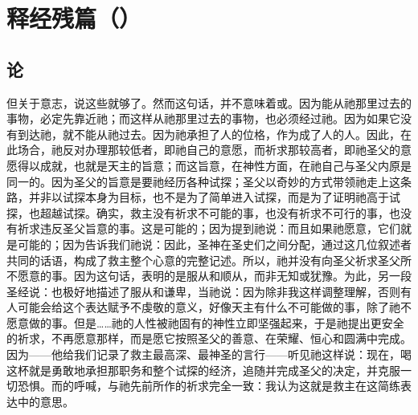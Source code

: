
\chapter{释经残篇（）}



\section{论}

\par

但关于意志，说这些就够了。然而这句话，并不意味着或。因为能从祂那里过去的事物，必定先靠近祂；而这样从祂那里过去的事物，也必须经过祂。因为如果它没有到达祂，就不能从祂过去。因为祂承担了人的位格，作为成了人的人。因此，在此场合，祂反对办理那较低者，即祂自己的意愿，而祈求那较高者，即祂圣父的意愿得以成就，也就是天主的旨意；而这旨意，在神性方面，在祂自己与圣父内原是同一的。因为圣父的旨意是要祂经历各种试探；圣父以奇妙的方式带领祂走上这条路，并非以试探本身为目标，也不是为了简单进入试探，而是为了证明祂高于试探，也超越试探。确实，救主没有祈求不可能的事，也没有祈求不可行的事，也没有祈求违反圣父旨意的事。这是可能的；因为提到祂说：而且如果祂愿意，它们就是可能的；因为告诉我们祂说：因此，圣神在圣史们之间分配，通过这几位叙述者共同的话语，构成了救主整个心意的完整记述。所以，祂并没有向圣父祈求圣父所不愿意的事。因为这句话，表明的是服从和顺从，而非无知或犹豫。为此，另一段圣经说：也极好地描述了服从和谦卑，当祂说：因为除非我这样调整理解，否则有人可能会给这个表达赋予不虔敬的意义，好像天主有什么不可能做的事，除了祂不愿意做的事。但是……祂的人性被祂固有的神性立即坚强起来，于是祂提出更安全的祈求，不再愿意那样，而是愿它按照圣父的善意、在荣耀、恒心和圆满中完成。因为——他给我们记录了救主最高深、最神圣的言行——听见祂这样说：现在，喝这杯就是勇敢地承担那职务和整个试探的经济，追随并完成圣父的决定，并克服一切恐惧。而的呼喊，与祂先前所作的祈求完全一致：我认为这就是救主在这简练表达中的意思。\par

